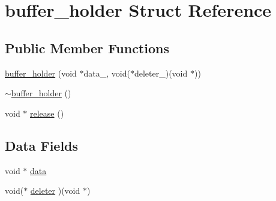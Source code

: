 \hypertarget{structbuffer__holder}{
\section{buffer\_\-holder Struct Reference}
\label{structbuffer__holder}
}
\subsection*{Public Member Functions}
\begin{DoxyCompactItemize}
\item 
\hyperlink{structbuffer__holder_aec91ad4dabc8db2a6cacac601b317857}{buffer\_\-holder} (void $\ast$data\_\-, void($\ast$deleter\_\-)(void $\ast$))
\item 
\hyperlink{structbuffer__holder_a43e10af0ca501bfa9bd1c2a012937876}{$\sim$buffer\_\-holder} ()
\item 
void $\ast$ \hyperlink{structbuffer__holder_add9b75027bdf15dee0e2dc88225d5b10}{release} ()
\end{DoxyCompactItemize}
\subsection*{Data Fields}
\begin{DoxyCompactItemize}
\item 
void $\ast$ \hyperlink{structbuffer__holder_a06c1e1004fac90848dfdb4fbc150cede}{data}
\item 
void($\ast$ \hyperlink{structbuffer__holder_a96e7067c68bc1f7a9ee7dd75c84f04e8}{deleter} )(void $\ast$)
\end{DoxyCompactItemize}


